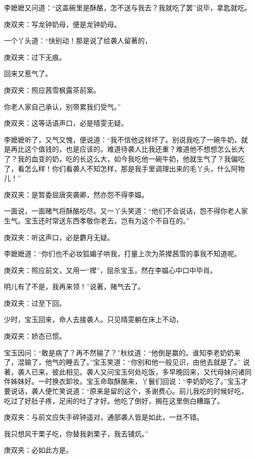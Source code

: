 \begin{parag}
    李嬷嬷又问道：“这盖碗里是酥酪，怎不送与我去？我就吃了罢”说毕，拿匙就吃。\begin{note}庚双夹：写龙钟奶母，便是龙钟奶母。\end{note}一个丫头道：“快别动！那是说了给袭人留著的，\begin{note}庚双夹：过下无痕。\end{note}回来又惹气了。\begin{note}庚双夹：照应茜雪枫露茶前案。\end{note}你老人家自己承认，别带累我们受气。”\begin{note}庚双夹：这等话语声口，必是晴雯无疑。\end{note}李嬷嬷听了，又气又愧，便说道：“我不信他这样坏了。别说我吃了一碗牛奶，就是再比这个值钱的，也是应该的。难道待袭人比我还重？难道他不想想怎么长大了？我的血变的奶，吃的长这么大，如今我吃他一碗牛奶，他就生气了？我偏吃了，看怎么样！你们看袭人不知怎样，那是我手里调理出来的毛丫头，什么阿物儿！”\begin{note}庚双夹：是暂委屈唐突袭卿，然亦怨不得李媪。\end{note}一面说，一面赌气将酥酪吃尽。又一丫头笑道：“他们不会说话，怨不得你老人家生气。宝玉还时常送东西孝敬你老去，岂有为这个不自在的。”\begin{note}庚双夹：听这声口，必是麝月无疑。\end{note}李嬷嬷道：“你们也不必妆狐媚子哄我，打量上次为茶撵茜雪的事我不知道呢。\begin{note}庚双夹：照应前文，又用一“撵”，屈杀宝玉，然在李媪心中口中毕肖。\end{note}明儿有了不是，我再来领！”说著，赌气去了。\begin{note}庚双夹：过至下回。\end{note}
\end{parag}


\begin{parag}
    少时，宝玉回来，命人去接袭人。只见晴雯躺在床上不动，\begin{note}庚双夹：娇态已惯。\end{note}宝玉因问：“敢是病了？再不然输了？”秋纹道：“他倒是赢的。谁知李老奶奶来了，混输了，他气的睡去了。”宝玉笑道：“你别和他一般见识，由他去就是了。” 说著，袭人已来，彼此相见。袭人又问宝玉何处吃饭，多早晚回来，又代母妹问诸同伴姊妹好。一时换衣卸妆。宝玉命取酥酪来，丫鬟们回说：“李奶奶吃了。”宝玉才要说话，袭人便忙笑说道：“原来是留的这个，多谢费心。前儿我吃的时候好吃，吃过了好肚子疼，足闹的吐了才好。他吃了倒好，搁在这里倒白糟蹋了。\begin{note}庚双夹：与前文应失手碎钟遥对，通部袭人皆是如此，一丝不错。\end{note}我只想风干栗子吃，你替我剥栗子，我去铺炕。”\begin{note}庚双夹：必如此方是。\end{note}
\end{parag}


